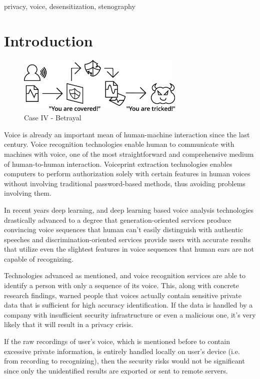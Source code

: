 \documentclass[journal]{IEEEtran} %
\begin{document}
\begin{IEEEkeywords}
    privacy, voice, desensitization, stenography
\end{IEEEkeywords}

\section{Introduction}

\begin{figure}[htbp]
    \centerline{\includegraphics[width=8cm]{case4.png}}
    \caption{Case IV - Betrayal}
    \label{case4}
\end{figure}

Voice is already an important mean of human-machine interaction since the last century. Voice recognition technologies enable human to communicate with machines with voice, one of the most straightforward and comprehensive medium of human-to-human interaction. Voiceprint extraction technologies enables computers to perform authorization solely with certain features in human voices without involving traditional password-based methods, thus avoiding problems involving them.

In recent years deep learning, and deep learning based voice analysis technologies drastically advanced to a degree that generation-oriented services produce convincing voice sequences that human can't easily distinguish with authentic speeches and discrimination-oriented services provide users with accurate results that utilize even the slightest features in voice sequences that human ears are not capable of recognizing\cite{a12}.

Technologies advanced as mentioned, and voice recognition services are able to identify a person with only a sequence of its voice. This, along with concrete research findings, warned people that voices actually contain sensitive private data that is sufficient for high accuracy identification\cite{a6, a7}. If the data is handled by a company with insufficient security infrastructure or even a malicious one, it's very likely that it will result in a privacy crisis.

If the raw recordings of user's voice, which is mentioned before to contain excessive private information, is entirely handled locally on user's device (i.e. from recording to recognizing), then the security risks would not be significant since only the unidentified results are exported or sent to remote servers.
\end{document}
